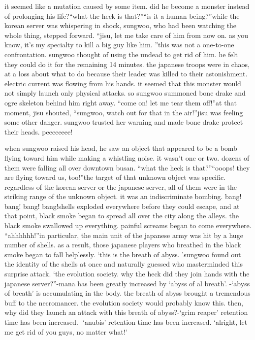  it seemed like a mutation caused by some item.
 did he become a monster instead of prolonging his life?“what the heck is that?”“is it a human being?”while the korean server was whispering in shock, sungwoo, who had been watching the whole thing, stepped forward.
“jisu, let me take care of him from now on.
 as you know, it’s my specialty to kill a big guy like him.
”this was not a one-to-one confrontation.
 sungwoo thought of using the undead to get rid of him.
 he felt they could do it for the remaining 14 minutes.
the japanese troops were in chaos, at a loss about what to do because their leader was killed to their astonishment.
electric current was flowing from his hands.
 it seemed that this monster would not simply launch only physical attacks.
 so sungwoo summoned bone drake and ogre skeleton behind him right away.
“come on! let me tear them off!”at that moment, jisu shouted, “sungwoo, watch out for that in the air!”jisu was feeling some other danger.
sungwoo trusted her warning and made bone drake protect their heads.
peeeeeeee!

when sungwoo raised his head, he saw an object that appeared to be a bomb flying toward him while making a whistling noise.
 it wasn’t one or two.
 dozens of them were falling all over downtown busan.
“what the heck is that?”“ooops! they are flying toward us, too!”the target of that unknown object was specific.
regardless of the korean server or the japanese server, all of them were in the striking range of the unknown object.
 it was an indiscriminate bombing.
bang! bang! bang! bang!shells exploded everywhere before they could escape, and at that point, black smoke began to spread all over the city along the alleys.
the black smoke swallowed up everything.
 painful screams began to come everywhere.
“ahhhhhh!”in particular, the main unit of the japanese army was hit by a huge number of shells.
as a result, those japanese players who breathed in the black smoke began to fall helplessly.
‘this is the breath of abyss.
’sungwoo found out the identity of the shells at once and naturally guessed who masterminded this surprise attack.
‘the evolution society.
 why the heck did they join hands with the japanese server?”-mana has been greatly increased by ‘abyss of al breath’.
-‘abyss of breath’ is accumulating in the body.
the breath of abyss brought a tremendous buff to the necromancer.
 the evolution society would probably know this.
 then, why did they launch an attack with this breath of abyss?-‘grim reaper’ retention time has been increased.
-‘anubis’ retention time has been increased.
‘alright, let me get rid of you guys, no matter what!’

 